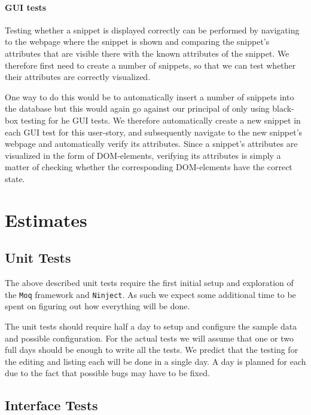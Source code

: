 \documentclass[10pt,a4paper,BCOR12mm, headexclude, footexclude,
  twoside, openright]{scrartcl}
\numberwithin{equation}{section} %
\numberwithin{figure}{section} %
\numberwithin{table}{section} %
\begin{document}
\paragraph{GUI tests}
Testing whether a snippet is displayed correctly can be performed by navigating to the webpage where the snippet is shown and comparing the snippet's attributes that are visible there with the known attributes of the snippet.
We therefore first need to create a number of snippets, so that we can test whether their attributes are correctly visualized.

One way to do this would be to automatically insert a number of snippets into the database but this would again go against our principal of only using black-box testing for he GUI tests.
We therefore automatically create a new snippet in each GUI test for this user-story, and subsequently navigate to the new snippet's webpage and automatically verify its attributes.
Since a snippet's attributes are visualized in the form of DOM-elements, verifying its attributes is simply a matter of checking whether the corresponding DOM-elements have the correct state.

\section{Estimates}
\subsection{Unit Tests}
The above described unit tests require the first initial setup and exploration
of the \texttt{Moq} framework and \texttt{Ninject}. As such we expect some
additional time to be spent on figuring out how everything will be done.

The unit tests should require half a day to setup and configure the sample data
and possible configuration. For the actual tests we will assume that one or two
full days should be enough to write all the tests. We predict that the testing
for the editing and listing each will be done in a single day. A day is planned
for each due to the fact that possible bugs may have to be fixed.
\subsection{Interface Tests}
\end{document}
